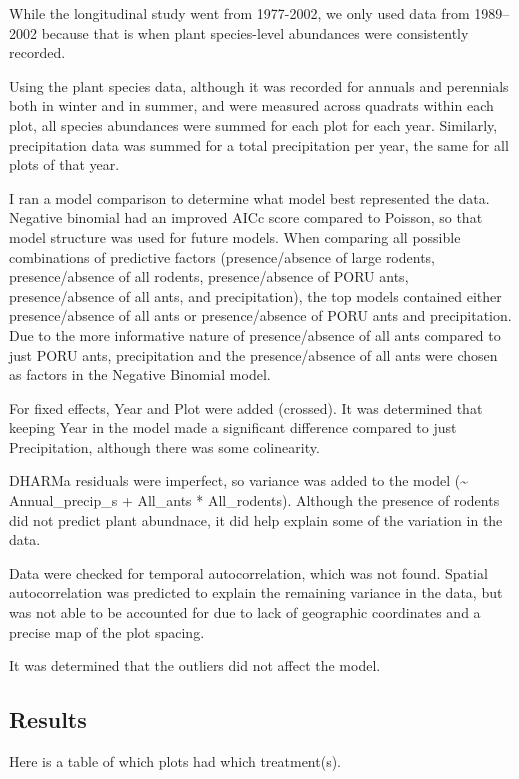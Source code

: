\documentclass[
]{article}
\begin{document}
While the longitudinal study went from 1977-2002, we only used data from
1989--2002 because that is when plant species-level abundances were
consistently recorded.

Using the plant species data, although it was recorded for annuals and
perennials both in winter and in summer, and were measured across
quadrats within each plot, all species abundances were summed for each
plot for each year. Similarly, precipitation data was summed for a total
precipitation per year, the same for all plots of that year.

I ran a model comparison to determine what model best represented the
data. Negative binomial had an improved AICc score compared to Poisson,
so that model structure was used for future models. When comparing all
possible combinations of predictive factors (presence/absence of large
rodents, presence/absence of all rodents, presence/absence of PORU ants,
presence/absence of all ants, and precipitation), the top models
contained either presence/absence of all ants or presence/absence of
PORU ants and precipitation. Due to the more informative nature of
presence/absence of all ants compared to just PORU ants, precipitation
and the presence/absence of all ants were chosen as factors in the
Negative Binomial model.

For fixed effects, Year and Plot were added (crossed). It was determined
that keeping Year in the model made a significant difference compared to
just Precipitation, although there was some colinearity.

DHARMa residuals were imperfect, so variance was added to the model
(\textasciitilde{} Annual\_precip\_s + All\_ants * All\_rodents).
Although the presence of rodents did not predict plant abundnace, it did
help explain some of the variation in the data.

Data were checked for temporal autocorrelation, which was not found.
Spatial autocorrelation was predicted to explain the remaining variance
in the data, but was not able to be accounted for due to lack of
geographic coordinates and a precise map of the plot spacing.

It was determined that the outliers did not affect the model.

\subsection{Results}\label{results}

Here is a table of which plots had which treatment(s).
\end{document}
